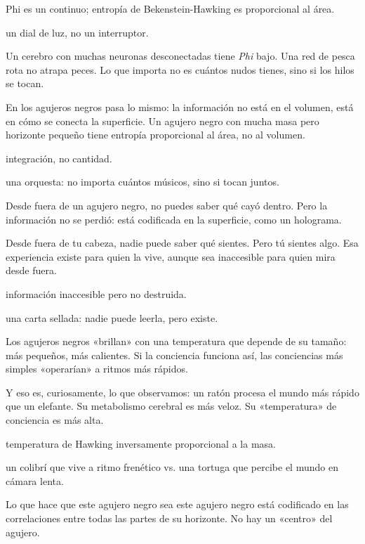 \begin{fisica}
 Phi es un continuo; entropía de Bekenstein-Hawking es proporcional al área.

 un dial de luz, no un interruptor.
\end{fisica}
\noindent Un cerebro con muchas neuronas desconectadas tiene \emph{Phi} bajo. Una red de pesca rota no atrapa peces. Lo que importa no es cuántos nudos tienes, sino si los hilos se tocan.

En los agujeros negros pasa lo mismo: la información no está en el volumen, está en cómo se conecta la superficie. Un agujero negro con mucha masa pero horizonte pequeño tiene entropía proporcional al área, no al volumen.

\begin{fisica}
 integración, no cantidad.

 una orquesta: no importa cuántos músicos, sino si tocan juntos.
\end{fisica}
\noindent Desde fuera de un agujero negro, no puedes saber qué cayó dentro. Pero la información no se perdió: está codificada en la superficie, como un holograma.

Desde fuera de tu cabeza, nadie puede saber qué sientes. Pero tú sientes algo. Esa experiencia existe para quien la vive, aunque sea inaccesible para quien mira desde fuera.

\begin{fisica}
 información inaccesible pero no destruida.

 una carta sellada: nadie puede leerla, pero existe.
\end{fisica}
\noindent Los agujeros negros «brillan» con una temperatura que depende de su tamaño: más pequeños, más calientes. Si la conciencia funciona así, las conciencias más simples «operarían» a ritmos más rápidos.

Y eso es, curiosamente, lo que observamos: un ratón procesa el mundo más rápido que un elefante. Su metabolismo cerebral es más veloz. Su «temperatura» de conciencia es más alta.

\begin{fisica}
 temperatura de Hawking inversamente proporcional a la masa.

 un colibrí que vive a ritmo frenético vs. una tortuga que percibe el mundo en cámara lenta.
\end{fisica}
\noindent Lo que hace que este agujero negro sea este agujero negro está codificado en las correlaciones entre todas las partes de su horizonte. No hay un «centro» del agujero.

